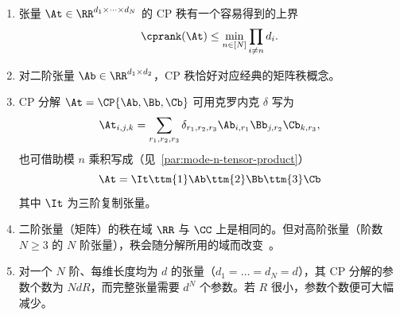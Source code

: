 \begin{remark}
\begin{enumerate}
\begin{align*}
\begin{tikzpicture}[baseline=\baseline]
    \draw[edge](C) -- (\x+2,\y-0.7)node [midway,left] {\scalebox{0.7}{\dimcolor{$d_3$}}};
    \draw[edge](D) -- (\x+3,\y-0.7) node [midway,left] {\scalebox{0.7}{\dimcolor{$d_4$}}};
\end{tikzpicture}\right)_{(\{1,2\})}\\
&=
\begin{tikzpicture}[baseline=\baseline]
    \tikzset{tensor/.style = {minimum size = 0.5cm,shape = circle,thick,draw=black,inner sep = 0pt}, edge/.style   = {thick,line width=.4mm},every loop/.style={}}
    \def\y{0}
    \def\x{0}
  \node[tensor,fill=red!50!white] (A) at (\x,\y){\scalebox{0.85}{$\Ab_1$}};
  \node[tensor,fill=blue!50!white] (B) at (\x+1,\y){$\Ab_2$};
   \node[tensor,fill=red!20!white] (C) at (\x+2,\y){$\Ab_3$};
    \node[tensor,fill=blue!20!white] (D) at (\x+3,\y){$\Ab_4$};
    \draw  node[fill = black,circle,inner sep=0pt,minimum size=4pt] (m1) at (\x+0.5,\y+0.7) {};
    \draw  node[fill = black,circle,inner sep=0pt,minimum size=4pt] (m2) at (\x+2.5,\y+0.7) {};
    \draw[edge](A) -- (\x,\y-0.65) -- (\x+0.5,\y-0.65) -- (\x+0.5,\y-1);
    \draw[edge](B) -- (\x+1,\y-0.65) -- (\x+0.6,\y-0.65) -- (\x+0.6,\y-1);
    \draw[edge](C) -- (\x+2,\y-0.65) -- (\x+2.5,\y-0.65) -- (\x+2.5,\y-1);
    \draw[edge](D) -- (\x+3,\y-0.65) -- (\x+2.6,\y-0.65) -- (\x+2.6,\y-1);
    \node[draw=none] at (\x+0.55,\y-1.15){\scalebox{0.7}{\dimcolor{$d_1d_2$}}};
    \node[draw=none] at (\x+2.55,\y-1.15){\scalebox{0.7}{\dimcolor{$d_3d_4$}}};
    \draw[dotted] (\x+1.5,\y+1.5) -- (\x+1.5,\y-0.7);
    \draw[edge](A) -- (m1)node [midway,left] {\scalebox{0.7}{\dimcolor{$R$}}};;
    \draw[edge](B) -- (m1)node [midway,right] {\scalebox{0.7}{\dimcolor{$R$}}};
    \draw[edge](C) -- (m2)node [midway,left] {\scalebox{0.7}{\dimcolor{$R$}}};
    \draw[edge](D) -- (m2)node [midway,right] {\scalebox{0.7}{\dimcolor{$R$}}};
    \draw[edge](m1)--(m2)node [near start, above] {\scalebox{0.7}{\dimcolor{$R$}}};
\end{tikzpicture}.
\end{align*}
\item  张量 $\At \in \RR^{d_1\times \cdots \times d_N}$ 的 CP 秩有一个容易得到的上界~\citep{kolda2009tensor}
$$\cprank(\At)\leq \min_{n\in [N]} \prod_{i\neq n} d_i.$$
\item 对二阶张量 $\Ab\in\RR^{d_1\times d_2}$，CP 秩恰好对应经典的矩阵秩概念。
\item CP 分解 $\At = \CP{\Ab,\Bb,\Cb}$ 可用克罗内克 $\delta$ 写为
$$\At_{i,j,k} = \sum_{r_1,r_2,r_3}\delta_{r_1,r_2,r_3}\Ab_{i,r_1}\Bb_{j,r_2}\Cb_{k,r_3},$$
也可借助模 $n$ 乘积写成（见~\ref{par:mode-n-tensor-product}）
$$\At = \It\ttm{1}\Ab\ttm{2}\Bb\ttm{3}\Cb$$
其中 $\It$ 为三阶复制张量。
\item 二阶张量（矩阵）的秩在域 $\RR$ 与 $\CC$ 上是相同的。但对高阶张量（阶数 $N\geq3$ 的 $N$ 阶张量），秩会随分解所用的域而改变~\citep{kruskal1989rank}。
\item 对一个 $N$ 阶、每维长度均为 $d$ 的张量（$d_1 = \dots = d_N = d$），其 CP 分解的参数个数为 $NdR$，而完整张量需要 $d^N$ 个参数。若 $R$ 很小，参数个数便可大幅减少。
\end{enumerate}
\end{remark}
